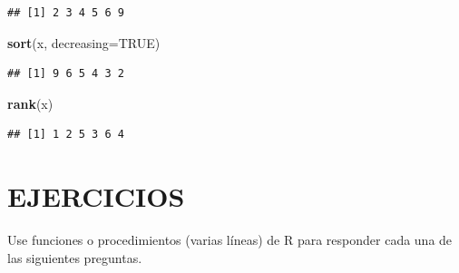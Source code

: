 \documentclass[10pt,]{krantz}
\makeatletter
\newenvironment{Shaded}{\begin{snugshade}}{\end{snugshade}}
\newcommand{\KeywordTok}[1]{\textcolor[rgb]{0.13,0.29,0.53}{\textbf{{#1}}}}
\newcommand{\DataTypeTok}[1]{\textcolor[rgb]{0.13,0.29,0.53}{{#1}}}
\newcommand{\OtherTok}[1]{\textcolor[rgb]{0.56,0.35,0.01}{{#1}}}
\newcommand{\NormalTok}[1]{{#1}}
\let\proglang=\textsf
\newenvironment{kframe}{%
\medskip{}
\setlength{\fboxsep}{.8em}
 \def\at@end@of@kframe{}%
 \ifinner\ifhmode%
  \def\at@end@of@kframe{\end{minipage}}%
  \begin{minipage}{\columnwidth}%
 \fi\fi%
 \def\FrameCommand##1{\hskip\@totalleftmargin \hskip-\fboxsep
 \colorbox{shadecolor}{##1}\hskip-\fboxsep
     \hskip-\linewidth \hskip-\@totalleftmargin \hskip\columnwidth}%
 \MakeFramed {\advance\hsize-\width
   \@totalleftmargin\z@ \linewidth\hsize
   \@setminipage}}%
 {\par\unskip\endMakeFramed%
 \at@end@of@kframe}
\renewenvironment{Shaded}{\begin{kframe}}{\end{kframe}}
\makeatother
\begin{document}
\begin{verbatim}
## [1] 2 3 4 5 6 9
\end{verbatim}

\begin{Shaded}
\begin{Highlighting}[]
\KeywordTok{sort}\NormalTok{(x, }\DataTypeTok{decreasing=}\OtherTok{TRUE}\NormalTok{)}
\end{Highlighting}
\end{Shaded}

\begin{verbatim}
## [1] 9 6 5 4 3 2
\end{verbatim}

\begin{Shaded}
\begin{Highlighting}[]
\KeywordTok{rank}\NormalTok{(x)}
\end{Highlighting}
\end{Shaded}

\begin{verbatim}
## [1] 1 2 5 3 6 4
\end{verbatim}

\section*{EJERCICIOS}\label{ejercicios-1}


Use funciones o procedimientos (varias líneas) de \proglang{R} para
responder cada una de las siguientes preguntas.
\end{document}
